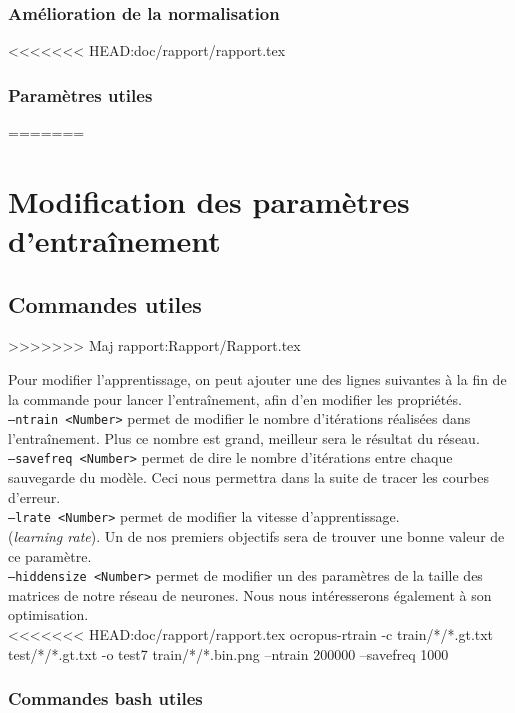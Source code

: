 \documentclass{article}
\begin{document}
\subsubsection{Amélioration de la normalisation}



<<<<<<< HEAD:doc/rapport/rapport.tex
\subsubsection{Paramètres utiles}
=======

\section{Modification des paramètres d'entraînement}

\subsection{Commandes utiles}
>>>>>>>  Maj rapport:Rapport/Rapport.tex

Pour modifier l'apprentissage, on peut ajouter une des lignes suivantes à la fin de la commande pour lancer l'entraînement, afin d'en modifier les propriétés. \\
\noindent \texttt{--ntrain <Number>} permet de modifier le nombre d'itérations réalisées dans l'entraînement. Plus ce nombre est grand, meilleur sera le résultat du réseau. \\
\texttt{--savefreq <Number>} permet de dire le nombre d'itérations entre chaque sauvegarde du modèle. Ceci nous permettra dans la suite de tracer les courbes d'erreur. \\
\texttt{--lrate <Number>} permet de modifier la vitesse d'apprentissage. \\ (\textit{learning rate}). Un de nos premiers objectifs sera de trouver une bonne valeur de ce paramètre. \\
\texttt{--hiddensize <Number>} permet de modifier un des paramètres de la taille des matrices de notre réseau de neurones. Nous nous intéresserons également à son optimisation. \\

<<<<<<< HEAD:doc/rapport/rapport.tex
ocropus-rtrain -c train/*/*.gt.txt test/*/*.gt.txt -o test7 train/*/*.bin.png --ntrain 200000 --savefreq 1000

\subsubsection{Commandes bash utiles}
\end{document}
